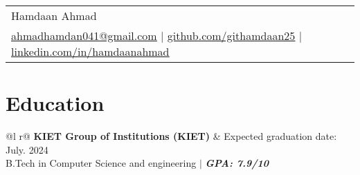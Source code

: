 \documentclass[a4paper,8pt]{article}
\begin{document}
\pagestyle{empty} 



\begin{center}
\begin{tabularx}{\linewidth}{@{} >{\centering\arraybackslash}X @{}}
  \color[HTML]{1C033C} \Huge{Hamdaan Ahmad} \\[6pt]
  \textcolor[HTML]{371e77}{\underline{\href{mailto:ahmadhamdan041@gmail.com}{\raisebox{-0.05\height}{\faEnvelope} ahmadhamdan041@gmail.com}} $|$}
  \textcolor[HTML]{371e77}{\underline{\href{https://github.com/githamdaan25}{\raisebox{-0.05\height}{\faGithub} github.com/githamdaan25}} $|$}
  \textcolor[HTML]{371e77}{\underline{\href{https://www.linkedin.com/in/hamdaanahmad/}{\raisebox{-0.05\height}{\faLinkedin} linkedin.com/in/hamdaanahmad}}}
\end{tabularx}
\end{center}

\section{Education}
\begin{tabularx}{\linewidth}{ @{}l r@{} }
\color[HTML]{1C033C} \textbf{KIET Group of Institutions (KIET)} & \hfill \color[HTML]{371e77} Expected graduation date: July. 2024 \\
\color[HTML]{371e77} B.Tech in Computer Science and engineering $|$ 
\color[HTML]{4B28A4} \textit{\textbf{GPA: 7.9/10}} \\
\end{tabularx}


\end{document}
